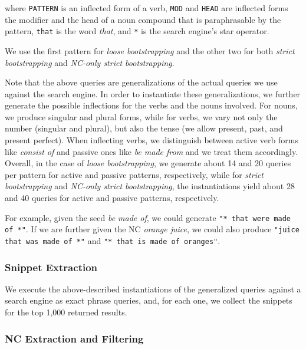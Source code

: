 \documentclass[letterpaper,11pt]{article}
\begin{document}
\noindent where  \texttt{PATTERN} is  an inflected  form of  a verb,
\texttt{MOD}  and \texttt{HEAD} are inflected forms
the  modifier and the head of a noun compound that is paraphrasable by the pattern,
\texttt{that} is the  word \emph{that},
and  \texttt{*} is  the  search engine's  star operator.

We use the first  pattern for \emph{loose bootstrapping} and
the other  two for both \emph{strict  bootstrapping} and \emph{NC-only
strict bootstrapping}.

Note that the above queries  are generalizations of the actual queries
we  use against  the  search  engine. In  order  to instantiate  these
generalizations, we further generate  the possible inflections for the
verbs  and the  nouns involved.  For nouns,  we produce singular and
plural forms, while  for verbs, we vary not only  the number (singular
and plural), but  also the tense (we allow present,  past, and present
perfect). When  inflecting verbs,  we distinguish between  active verb
forms  like \emph{consist  of}  and passive  ones  like \emph{be  made
from} and  we treat  them accordingly.
Overall, in the case of  \emph{loose bootstrapping}, we generate about
14  and  20 queries  per  pattern  for  active and  passive  patterns,
respectively, while for  \emph{strict bootstrapping} and \emph{NC-only
strict  bootstrapping},  the  instantiations  yield about  28  and  40
queries for active and passive patterns, respectively.

For example, given the seed \emph{be made of},
we could generate
\texttt{"* that were made of *"}.
If we are further given the NC \emph{orange juice},
we could also produce
\texttt{"juice that was made of *"} and
\texttt{"* that is made of oranges"}.



\subsubsection{Snippet Extraction}
\label{sec:snippet:extract:step1}

We  execute  the  above-described instantiations  of  the  generalized
queries against a search engine as exact phrase queries, and, for each
one, we collect the snippets for the top 1,000 returned results.


\subsubsection{NC Extraction and Filtering}
\label{sec:NC:extract}
\end{document}
